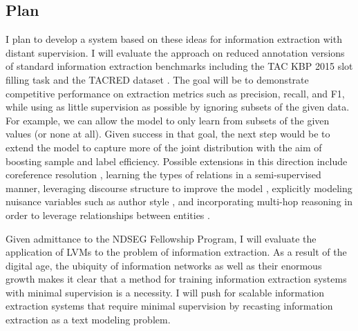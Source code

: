 \documentclass[12pt]{article}
\begin{document}
\subsection*{Plan}

I plan to develop a system based on these ideas for information extraction with distant supervision. I will evaluate the approach on reduced annotation versions of standard information extraction benchmarks including the TAC KBP 2015 slot filling task and the TACRED dataset \citep{zhang2017slotfilling}.
The goal will be to demonstrate competitive performance on
extraction metrics such as precision, recall, and F1, while using as little supervision
as possible by ignoring subsets of the given data.
For example, we can allow the model to only learn from
subsets of the given values (or none at all).
Given success in that goal, the next step would be to extend the model
to capture more of the joint distribution with the aim of boosting sample and label efficiency.
Possible extensions in this direction include coreference resolution \citep{haghighi2010coref},
learning the types of relations in a semi-supervised manner,
leveraging discourse structure to improve the model
\citep{sauper2009wiki}, explicitly modeling nuisance variables such as
author style \citep{hsu2017speech}, and incorporating multi-hop
reasoning in order to leverage relationships between entities
\citep{chen2018diva,rock17prove}.

Given admittance to the NDSEG Fellowship Program, I will evaluate the application of
LVMs to the problem of information extraction.
As a result of the digital age, the ubiquity of information networks as well as their 
enormous growth makes it clear that a method for training information extraction systems
with minimal supervision is a necessity.
I will push for scalable information extraction systems that require minimal supervision
by recasting information extraction as a text modeling problem.
\end{document}
